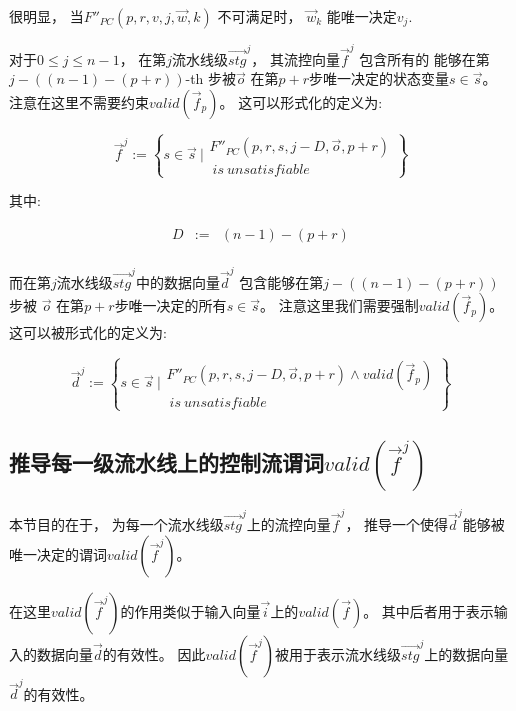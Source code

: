 很明显，
当$F''_{PC}(p,r,v,j,\vec{w},k)$ 不可满足时，
$\vec{w}_k$ 能唯一决定$v_j$.

对于$0\le j\le n-1$，
在第$j$流水线级$\vec{stg}^j$，
其流控向量$\vec{f}^j$ 包含所有的
能够在第$j-((n-1)-(p+r))$-th 步被$\vec{o}$
在第$p+r$步唯一决定的状态变量$s\in \vec{s}$。
注意在这里不需要约束$valid(\vec{f}_p)$。
这可以形式化的定义为:

\begin{equation}\label{stgn_fj}
\vec{f}^{j} :=
 \left\{
 s\in \vec{s} ~|
\begin{array}{cc}
 F''_{PC}(p,r,s,j-D,\vec{o},p+r)\\
 ~is~unsatisfiable
\end{array}
\right\}
\end{equation}

其中:

\begin{equation}\label{stgn_def}
\begin{array}{ccc}
D             & := & (n-1)-(p+r)\\
\end{array}
\end{equation}

而在第$j$流水线级$\vec{stg}^j$中的数据向量$\vec{d}^j$
包含能够在第$j-((n-1)-(p+r))$步被
$\vec{o}$ 在第$p+r$步唯一决定的所有$s\in \vec{s}$。
注意这里我们需要强制$valid(\vec{f}_p)$。
这可以被形式化的定义为:

\begin{equation}\label{stgn_dj}
\vec{d}^{j} :=
 \left\{
 s\in \vec{s} ~|
 \begin{array}{cc}
 F''_{PC}(p,r,s,j-D,\vec{o},p+r)\wedge valid(\vec{f}_p)\\
 ~is~unsatisfiable
 \end{array}
\right\}
\end{equation}


\subsection{推导每一级流水线上的控制流谓词$valid(\vec{f}^j)$}\label{subsec_inferstage}
本节目的在于，
为每一个流水线级$\vec{stg}^j$上的流控向量$\vec{f}^j$，
推导一个使得$\vec{d}^j$能够被唯一决定的谓词$valid(\vec{f}^j)$。

在这里$valid(\vec{f}^j)$的作用类似于输入向量$\vec{i}$上的$valid(\vec{f})$。
其中后者用于表示输入的数据向量$\vec{d}$的有效性。
因此$valid(\vec{f}^j)$被用于表示流水线级$\vec{stg}^j$上的数据向量$\vec{d}^j$的有效性。

